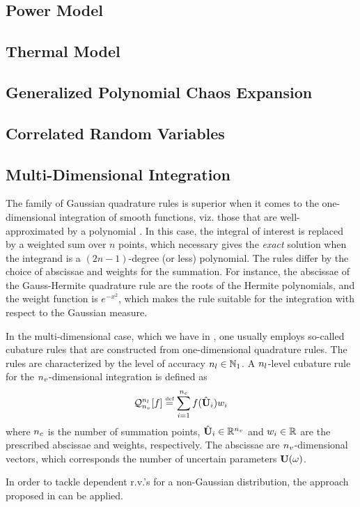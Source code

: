 \subsection{Power Model} 


\subsection{Thermal Model} 


\subsection{Generalized Polynomial Chaos Expansion}


\subsection{Correlated Random Variables}

\subsection{Multi-Dimensional Integration}
The family of Gaussian quadrature rules is superior when it comes to the one-dimensional integration of smooth functions, viz. those that are well-approximated by a polynomial \cite{press2007}. In this case, the integral of interest is replaced by a weighted sum over $n$ points, which necessary gives the \emph{exact} solution when the integrand is a $(2n - 1)$-degree (or less) polynomial. The rules differ by the choice of abscissae and weights for the summation. For instance, the abscissae of the Gauss-Hermite quadrature rule are the roots of the Hermite polynomials, and the weight function is $e^{-x^2}$, which makes the rule suitable for the integration with respect to the Gaussian measure.

In the multi-dimensional case, which we have in , one usually employs so-called cubature rules that are constructed from one-dimensional quadrature rules. The rules are characterized by the level of accuracy ${n_l} \in \mathbb{N}_{1}$. A ${n_l}$-level cubature rule for the ${n_v}$-dimensional integration is defined as
\[
  \oCub{\vars}{\cblevel}{f} \eqdef \sum_{i = 1}^{\cbpoints} f(\cbp{\vU}_i) w_i
\]
where ${n_c}$ is the number of summation points, $\cbp{\vU}_i \in \real^\vars$ and $w_i \in \mathbb{R}$ are the prescribed abscissae and weights, respectively. The abscissae are ${n_v}$-dimensional vectors, which corresponds the number of uncertain parameters $\vU(\o)$.

In order to tackle dependent r.v.'s for a non-Gaussian distribution, the approach proposed in \cite{babuska2010} can be applied.
